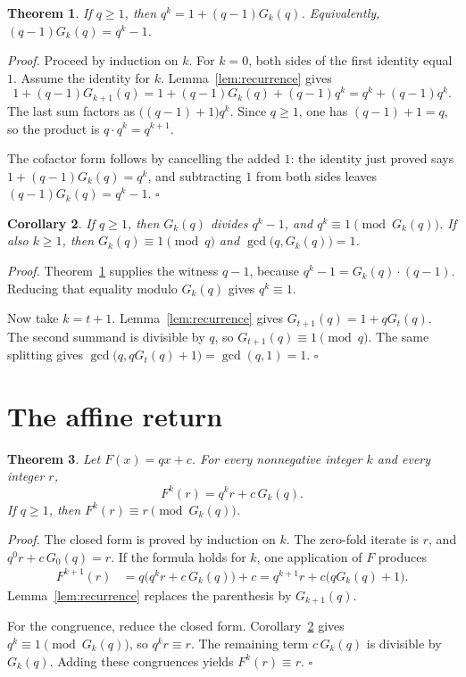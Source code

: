 \documentclass[11pt,letterpaper]{article}
\newtheorem{theorem}{Theorem}
\newtheorem{corollary}[theorem]{Corollary}
\newenvironment{proof}{\noindent\textit{Proof.}}{\hfill\(\square\)}
\begin{document}
\begin{theorem}
\label{thm:geom}
If \(q\ge 1\), then \(q^k=1+(q-1)G_k(q)\). Equivalently, \((q-1)G_k(q)=q^k-1\).
\end{theorem}

\begin{proof}
Proceed by induction on \(k\). For \(k=0\), both sides of the first identity equal \(1\). Assume the identity for \(k\). Lemma~\ref{lem:recurrence} gives
\[
1+(q-1)G_{k+1}(q)
=1+(q-1)G_k(q)+(q-1)q^k
=q^k+(q-1)q^k.
\]
The last sum factors as \(\bigl((q-1)+1\bigr)q^k\). Since \(q\ge 1\), one has \((q-1)+1=q\), so the product is \(q\cdot q^k=q^{k+1}\).

The cofactor form follows by cancelling the added \(1\): the identity just proved says \(1+(q-1)G_k(q)=q^k\), and subtracting \(1\) from both sides leaves \((q-1)G_k(q)=q^k-1\).
\end{proof}

\begin{corollary}
\label{cor:div}
If \(q\ge 1\), then \(G_k(q)\) divides \(q^k-1\), and \(q^k\equiv 1\pmod{G_k(q)}\). If also \(k\ge 1\), then \(G_k(q)\equiv 1\pmod q\) and \(\gcd\bigl(q,G_k(q)\bigr)=1\).
\end{corollary}

\begin{proof}
Theorem~\ref{thm:geom} supplies the witness \(q-1\), because \(q^k-1=G_k(q)\cdot(q-1)\). Reducing that equality modulo \(G_k(q)\) gives \(q^k\equiv 1\).

Now take \(k=t+1\). Lemma~\ref{lem:recurrence} gives \(G_{t+1}(q)=1+qG_t(q)\). The second summand is divisible by \(q\), so \(G_{t+1}(q)\equiv 1\pmod q\). The same splitting gives \(\gcd\bigl(q,qG_t(q)+1\bigr)=\gcd(q,1)=1\).
\end{proof}

\section{The affine return}

\begin{theorem}
\label{thm:closed}
Let \(F(x)=qx+c\). For every nonnegative integer \(k\) and every integer \(r\),
\[
F^k(r)=q^kr+c\,G_k(q).
\]
If \(q\ge 1\), then \(F^k(r)\equiv r\pmod{G_k(q)}\).
\end{theorem}

\begin{proof}
The closed form is proved by induction on \(k\). The zero-fold iterate is \(r\), and \(q^0r+c\,G_0(q)=r\). If the formula holds for \(k\), one application of \(F\) produces
\begin{align*}
F^{k+1}(r)
&=q\bigl(q^kr+c\,G_k(q)\bigr)+c
=q^{k+1}r+c\bigl(qG_k(q)+1\bigr).
\end{align*}
Lemma~\ref{lem:recurrence} replaces the parenthesis by \(G_{k+1}(q)\).

For the congruence, reduce the closed form. Corollary~\ref{cor:div} gives \(q^k\equiv 1\pmod{G_k(q)}\), so \(q^kr\equiv r\). The remaining term \(c\,G_k(q)\) is divisible by \(G_k(q)\). Adding these congruences yields \(F^k(r)\equiv r\).
\end{proof}
\end{document}
